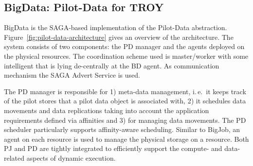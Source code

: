 \documentclass[conference,final]{IEEEtran}
\newcommand{\jhanote}[1]{ {\textcolor{red} { ***shantenu: #1 }}}
\newcommand{\alnote}[1]{ {\textcolor{blue} { ***andre: #1 }}}
\newcommand{\msnote}[1]{ {\textcolor{cyan} { ***mark: #1 }}}
\newcommand{\alnote}[1]{}
\newcommand{\jhanote}[1]{}
\newcommand{\msnote}[1]{}
\newcommand{\upp}{\vspace*{-0.5em}}
\begin{document}
% 
% 
% 


\subsection{BigData: Pilot-Data for TROY\upp\upp}
\label{sec:bigdata}

BigData is the SAGA-based implementation of the Pilot-Data abstraction.
Figure~\ref{fig:pilot-data-architecture} gives an overview of the
architecture. The system consists of two components: the PD manager and
the agents deployed on the physical resources. The coordination 
scheme used is master/worker with some intelligent that is lying de-centrally at 
the BD agent. As communication mechanism the SAGA Advert Service is used.


The PD manager is responsible for 1) meta-data management, i.\,e.\ it keeps
track of the pilot stores that a pilot data object is associated with, 2) it
schedules data movements and data replications taking into account the
application requirements defined via affinities and 3) for managing data
movements. The PD scheduler particularly supports affinity-aware scheduling.
Similar to BigJob, an agent on each resource is used to manage the physical
storage on a resource. Both PJ and PD are tightly integrated to efficiently support the compute- and data-related aspects of dynamic execution. 


% 
\end{document}
